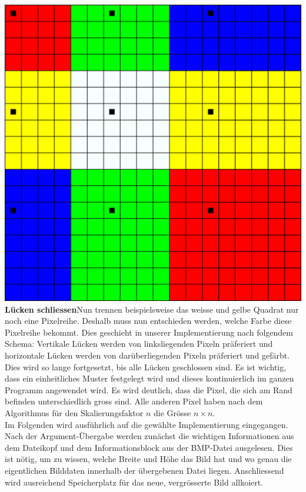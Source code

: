 \documentclass[course=erap]{aspdoc}
\begin{document}
\centering
\includegraphics[scale=0.27]{"3x3_6_zoomed_fertig_2"}\\
\justify
\textbf{Lücken schliessen}\hspace{0.5cm}Nun trennen beispielsweise das weisse und gelbe Quadrat nur noch eine Pixelreihe. Deshalb muss nun entschieden werden, welche Farbe diese Pixelreihe bekommt. Dies geschieht in unserer Implementierung nach folgendem Schema: Vertikale Lücken werden von linksliegenden Pixeln präferiert und horizontale Lücken werden von darüberliegenden Pixeln präferiert und gefärbt. Dies wird so lange fortgesetzt, bis alle Lücken geschlossen sind. Es ist wichtig, dass ein einheitliches Muster festgelegt wird und dieses kontinuierlich im ganzen Programm angewendet wird. Es wird deutlich, dass die Pixel, die sich am Rand befinden unterschiedlich gross sind. Alle anderen Pixel haben nach dem Algorithmus für den Skalierungsfaktor $n$ die Grösse $n \times n$.
\pagebreak\\
Im Folgenden wird ausführlich auf die gewählte Implementierung eingegangen. Nach der Argument-Übergabe werden zunächst die wichtigen Informationen aus dem Dateikopf und dem Informationsblock aus der BMP-Datei ausgelesen. Dies ist nötig, um zu wissen, welche Breite und Höhe das Bild hat und wo genau die eigentlichen Bilddaten innerhalb der übergebenen Datei liegen. Anschliessend wird ausreichend Speicherplatz für das neue, vergrösserte Bild allkoiert.\\\\  
\end{document}
